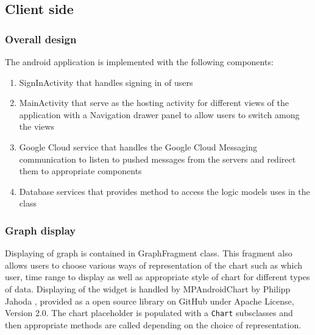 \subsection{Client side}
\subsubsection{Overall design}
The android application is implemented with the following components:
\begin{enumerate}
    \item SignInActivity that handles signing in of users
    \item MainActivity that serve as the hosting activity for different views of the application with a Navigation
        drawer panel to allow users to switch among the views
    \item Google Cloud service that handles the Google Cloud Messaging communication to listen to pushed messages from
        the servers and redirect them to appropriate components
    \item Database services that provides method to access the logic models uses in the class
\end{enumerate}

\subsubsection{Graph display}
Displaying of graph is contained in GraphFragment class. This fragment also allows users to choose various ways of
representation of the chart such as which user, time range to display as well as appropriate style of chart for
different types of data. Displaying of the widget is handled by MPAndroidChart by Philipp Jahoda \cite{MPAndroidChart},
provided as a open source library on GitHub under Apache License, Version 2.0. The chart placeholder is populated with a
\texttt{Chart} subsclasses and then appropriate methods are called depending on the choice of representation.


